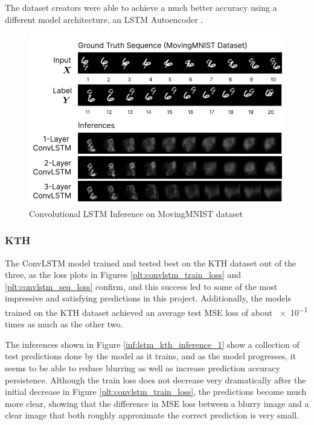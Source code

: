 \documentclass{scrartcl}
\begin{document}
The dataset creators were able to achieve a much better accuracy using a
different model architecture, an LSTM Autoencoder \cite{mmnist_dataset}.

\begin{figure}[H]
	\begin{center}
		\includegraphics[width=1\textwidth]{inferences/mmnist/mmnist_inferences_3.png}
	\end{center}
	\caption{Convolutional LSTM Inference on MovingMNIST dataset}
	\label{inf:convlstm_mmnist_inference_3}
\end{figure}

\subsubsection{KTH}
\label{subsubsec:kth}

The ConvLSTM model trained and tested best on the KTH dataset out of the three,
as the loss plots in Figures \ref{plt:convlstm_train_loss} and
\ref{plt:convlstm_seq_loss} confirm, and this success led to some of the most
impressive and satisfying predictions in this project. Additionally, the models
trained on the KTH dataset achieved an average test MSE loss of about \num{e-1}
times as much as the other two.  

The inferences shown in Figure \ref{inf:lstm_kth_inference_1} show a collection
of test predictions done by the model as it trains, and as the model
progresses, it seems to be able to reduce blurring as well as increase
prediction accuracy persistence. Although the train loss does not decrease very
dramatically after the initial decrease in Figure
\ref{plt:convlstm_train_loss}, the predictions become much more clear, showing
that the difference in MSE loss between a blurry image and a clear image that
both roughly approximate the correct prediction is very small.
\end{document}
